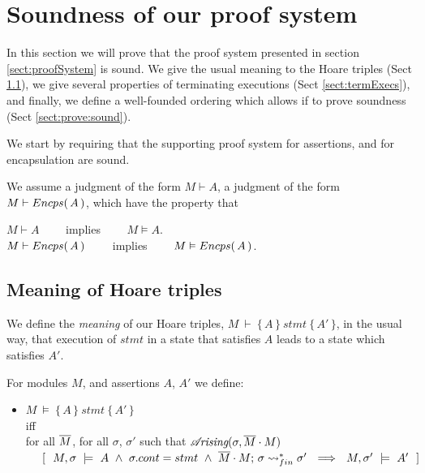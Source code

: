 


\section{Soundness of our proof system}

In this section we will prove that the proof system presented in section \ref{sect:proofSystem} is sound. We give the usual meaning to the Hoare triples (Sect \ref{sect:HLmeans}), we give several properties of terminating executions (Sect \ref{sect:termExecs}), and finally, we define a well-founded ordering which allows if to prove soundness (Sect \ref{sect:prove:sound}).

We start by requiring  that the supporting proof system for assertions, and for encapsulation are sound.
\begin{axiom}
We assume a judgment of the form $M \vdash A$,  a judgment of the form $M \vdash {\ensuremath Encps(\, A\, )}$, which have the property that
\begin{center}
$M \vdash A $ \ \ \ \ implies \ \ \ \ $M \vDash A$.\\
 $M \vdash {\ensuremath Encps(\, A\, )} $ \ \ \ \ implies \ \ \ \ $M \vDash {\ensuremath Encps(\, A\, )}$.
 \end{center}
\end{axiom}

\subsection{Meaning of Hoare triples}
\label{sect:HLmeans}

We  define the {\emph {meaning}} of  our Hoare triples, $M\ \vdash\  \{\, A \,  \}\ stmt\  \{\, A' \, \}$,  in the usual way, \ie that execution of $stmt$ in a state that satisfies $A$ leads to a state which satisfies $A'$. 

 
\begin{definition}

 
For modules $M$, and assertions $A$, $A'$   we define:
\begin{itemize}
\item
$M\ \models\  \{\, A \,  \}\ stmt\  \{\, A' \, \}$ \\
iff\\
 for   all $\overline{M}$, for all $\sigma$, $\sigma'$ such that {$\mathcal{A}\!\textit{rising}(\sigma, \overline{M}\cdot M)$}\\
$\strut ~ ~ ~ ~ [ \ \ M,\sigma \ \models \ A \ \wedge\  
 \sigma.cont = stmt  \ \wedge\     \leadstoBoundedStarFin {\Mtwo\cdot M}  {\sigma}  {\sigma'}    \ \ \Longrightarrow\ \ M,\sigma' \ \models \ A'\ \ ]$
\end{itemize}
\end{definition}
 
